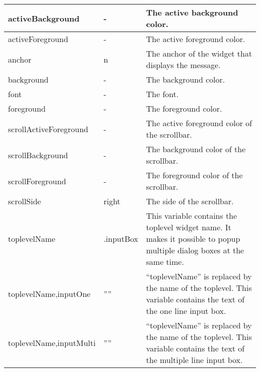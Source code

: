 {\newpage
\clearpage
\samepage \begin{supertabular}{|l|l|p{4.7cm}|}
activeBackground        & -         & The active background
                                      color.\\  \hline
activeForeground        & -         & The active foreground
                                      color.\\  \hline
anchor                  & n         & The anchor of the
                                      widget that displays
                                      the message.\\  \hline
background              & -         & The background
                                      color.\\  \hline
font                    & -         & The font.\\  \hline
foreground              & -         & The foreground
                                      color.\\  \hline
scrollActiveForeground  & -         & The active foreground
                                      color of the scrollbar.\\  \hline
scrollBackground        & -         & The background color
                                      of the scrollbar.\\  \hline
scrollForeground        & -         & The foreground color
                                      of the scrollbar.\\  \hline
scrollSide              & right     & The side of the
                                      scrollbar.\\  \hline
toplevelName            & .inputBox & This variable contains
                                      the top\-level widget
                                      name. It makes it
                                      possible to popup
                                      multiple dialog boxes
                                      at the same time.\\  \hline
toplevelName,inputOne   & ''''      & ``toplevelName'' is
                                      replaced by the name
                                      of the toplevel. This
                                      variable contains the
                                      text of the one line
                                      input box.\\  \hline
toplevelName,inputMulti & ''''      & ``toplevelName'' is
                                      replaced by the name
                                      of the toplevel. This
                                      variable contains the
                                      text of the multiple
                                      line input box.\\  \hline
\end{supertabular}
}


